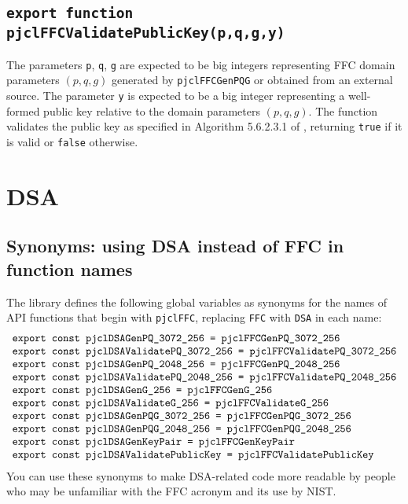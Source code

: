 \documentclass[12pt]{article}
\begin{document}
\subsection{\tt export function pjclFFCValidatePublicKey(p,q,g,y)}

The parameters  {\tt p}, {\tt q}, {\tt g} are expected to be
big integers representing FFC domain parameters $(p,q,g)$
generated by {\tt pjclFFCGenPQG} or obtained from an external source.
The parameter {\tt y} is expected to be a big integer representing a 
well-formed public key relative to the domain parameters $(p,q,g)$.
The function validates the public key as specified in Algorithm 5.6.2.3.1
of \cite{NIST-DH}, returning {\tt true} if it is valid or {\tt false}
otherwise.

\section{DSA}

\subsection{Synonyms: using DSA instead of FFC in function names}

The library defines the following global variables as 
synonyms for the names of API functions that begin with {\tt pjclFFC},
replacing {\tt FFC} with {\tt DSA} in each name:
$$
\begin{array}{l}
\mbox{\tt export const pjclDSAGenPQ\_3072\_256 = pjclFFCGenPQ\_3072\_256}\\
\mbox{\tt export const pjclDSAValidatePQ\_3072\_256 = pjclFFCValidatePQ\_3072\_256}\\
\mbox{\tt export const pjclDSAGenPQ\_2048\_256 = pjclFFCGenPQ\_2048\_256}\\
\mbox{\tt export const pjclDSAValidatePQ\_2048\_256 = pjclFFCValidatePQ\_2048\_256}\\
\mbox{\tt export const pjclDSAGenG\_256 = pjclFFCGenG\_256}\\
\mbox{\tt export const pjclDSAValidateG\_256 = pjclFFCValidateG\_256}\\
\mbox{\tt export const pjclDSAGenPQG\_3072\_256 = pjclFFCGenPQG\_3072\_256}\\
\mbox{\tt export const pjclDSAGenPQG\_2048\_256 = pjclFFCGenPQG\_2048\_256}\\
\mbox{\tt export const pjclDSAGenKeyPair = pjclFFCGenKeyPair}\\
\mbox{\tt export const pjclDSAValidatePublicKey = pjclFFCValidatePublicKey}
\end{array}
$$
You can use these synonyms to make DSA-related code more readable by people 
who may be unfamiliar with the FFC acronym and its use
by NIST.
\end{document}
